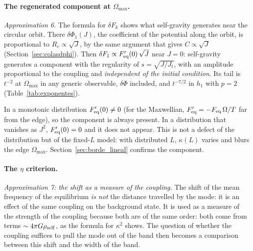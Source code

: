 \documentclass[11pt,a4paper]{article}
\begin{document}
\paragraph{The regenerated component at $\Omega_{\max}$.}
\label{sec:regenerada}
\emph{Approximation 6.} The formula for $\delta F_k$ shows what self-gravity generates near
the circular orbit. There $\delta\Phi_1(J)$, the coefficient of the potential along the
orbit, is proportional to $R_e\propto\sqrt J$, by the same argument that gives $C\propto\sqrt J$
(Section~\ref{sec:colasdphi}). Then $\delta F_1\propto F_{\rm eq}'(0)\,\sqrt J$ near $J=0$: self-gravity
generates a component with the regularity of $s=\sqrt{J/J_t}$, with an amplitude
proportional to the coupling and \emph{independent of the initial condition}. Its tail is
$t^{-2}$ at $\Omega_{\max}$ in any generic observable, $\delta\Phi$ included, and $t^{-7/2}$ in $h_1$
with $p=2$ (Table~\ref{tab:exponentes}).

In a monotonic distribution $F_{\rm eq}'(0)\ne0$ (for the Maxwellian,
$F_{\rm eq}'=-F_{\rm eq}\,\Omega/T$ far from the edge), so the component is always present. In a
distribution that vanishes as $J^2$, $F_{\rm eq}'(0)=0$ and it does not appear. This is not a
defect of the distribution but of the fixed-$L$ model: with distributed $L$, $\kappa(L)$
varies and blurs the edge $\Omega_{\max}$. Section~\ref{sec:borde_lineal} confirms the
component.

\paragraph{The $\eta$ criterion.}
\label{sec:eta}
\emph{Approximation 7: the shift as a measure of the coupling.} The shift of the mean
frequency of the equilibrium \emph{is not} the distance travelled by the mode: it is an
effect of the same coupling on the background state. It is used as a measure of the
strength of the coupling because both are of the same order: both come from terms
$\sim4\pi G\rho_{\rm self}$, as the formula for $\kappa^2$ shows. The question of whether the
coupling suffices to pull the mode out of the band then becomes a comparison between
this shift and the width of the band.
\end{document}
